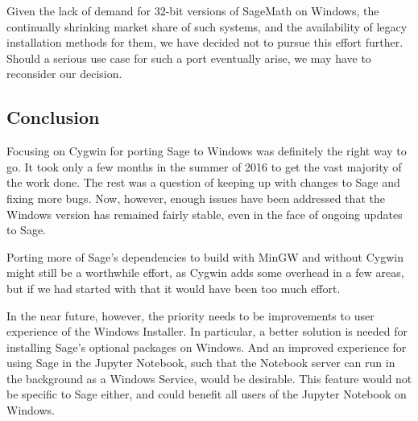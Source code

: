 Given the lack of demand for 32-bit versions of SageMath on Windows, the
continually shrinking market share of such systems, and the availability of
legacy installation methods for them, we have decided not to pursue this effort
further. Should a serious use case for such a port eventually arise, we may
have to reconsider our decision.

\hypertarget{conclusion}{%
\subsection{Conclusion}\label{conclusion}}

Focusing on Cygwin for porting Sage to Windows was definitely the right
way to go. It took only a few months in the summer of 2016 to get the
vast majority of the work done. The rest was a question of keeping
up with changes to Sage and fixing more bugs. Now, however, enough
issues have been addressed that the Windows version has remained fairly
stable, even in the face of ongoing updates to Sage.

Porting more of Sage's dependencies to build with MinGW and without
Cygwin might still be a worthwhile effort, as Cygwin adds some overhead
in a few areas, but if we had started with that it would have been too
much effort.

In the near future, however, the priority needs to be improvements to
user experience of the Windows Installer. In particular, a better
solution is needed for installing Sage's optional packages on Windows.
And an improved experience for using Sage in the Jupyter Notebook, such
that the Notebook server can run in the background as a Windows Service,
would be desirable. This feature would not be specific to Sage either, and
could benefit all users of the Jupyter Notebook on Windows.
